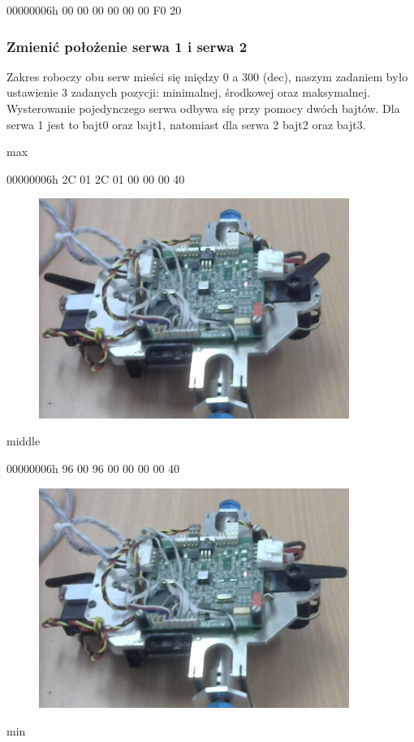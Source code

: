 \documentclass[margin = 2cm]{article}
\begin{document}
00000006h	00 00 00 00 00 00 F0 20
		\subsubsection{Zmienić położenie serwa 1 i serwa 2}
Zakres roboczy obu serw mieści się między 0 a 300 (dec), naszym zadaniem było ustawienie 3 zadanych pozycji: minimalnej, środkowej oraz maksymalnej. Wysterowanie pojedynczego serwa odbywa się przy pomocy dwóch bajtów. Dla serwa 1 jest to bajt0 oraz bajt1, natomiast dla    serwa 2  bajt2 oraz bajt3.

max

00000006h	2C 01 2C 01 00 00 00 40
		\begin{figure}[H]
			\centering
			\includegraphics[width=0.9\textwidth]{max}
		\end{figure}
middle

00000006h	96 00 96 00 00 00 00 40
		\begin{figure}[H]
			\centering
			\includegraphics[width=0.9\textwidth]{middle}
		\end{figure}
min
\end{document}
